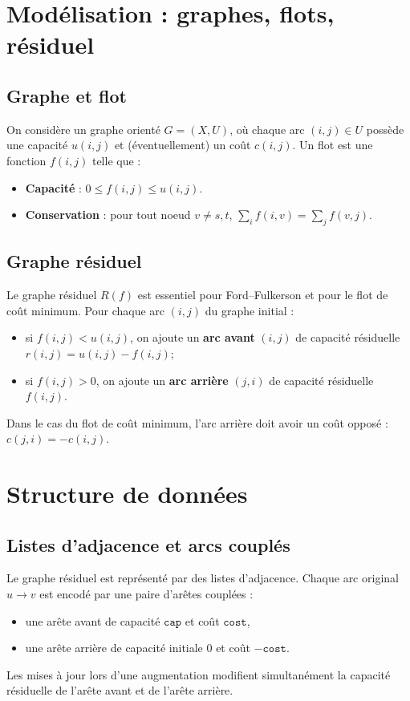 \documentclass{rapport}
\begin{document}
\section{Modélisation : graphes, flots, résiduel}\label{sec:model}
\subsection{Graphe et flot}
On considère un graphe orienté $G=(X,U)$, où chaque arc $(i,j)\in U$ possède une capacité $u(i,j)$ et (éventuellement) un coût $c(i,j)$. Un flot est une fonction $f(i,j)$ telle que :
\begin{itemize}
    \item \textbf{Capacité} : $0 \le f(i,j) \le u(i,j)$.
    \item \textbf{Conservation} : pour tout noeud $v\ne s,t$, $\sum_i f(i,v) = \sum_j f(v,j)$.
\end{itemize}

\subsection{Graphe résiduel}
Le graphe résiduel $R(f)$ est essentiel pour Ford--Fulkerson et pour le flot de coût minimum.
Pour chaque arc $(i,j)$ du graphe initial :
\begin{itemize}
    \item si $f(i,j) < u(i,j)$, on ajoute un \textbf{arc avant} $(i,j)$ de capacité résiduelle $r(i,j)=u(i,j)-f(i,j)$;
    \item si $f(i,j) > 0$, on ajoute un \textbf{arc arrière} $(j,i)$ de capacité résiduelle $f(i,j)$.
\end{itemize}
Dans le cas du flot de coût minimum, l'arc arrière doit avoir un coût opposé : $c(j,i) = -c(i,j)$.

\section{Structure de données}\label{sec:ds}
\subsection{Listes d'adjacence et arcs couplés}
Le graphe résiduel est représenté par des listes d'adjacence. Chaque arc original $u\to v$ est encodé par une paire d'arêtes couplées :
\begin{itemize}
    \item une arête \og avant \fg{} de capacité $\texttt{cap}$ et coût $\texttt{cost}$,
    \item une arête \og arrière \fg{} de capacité initiale 0 et coût $-\texttt{cost}$.
\end{itemize}
Les mises à jour lors d'une augmentation modifient simultanément la capacité résiduelle de l'arête avant et de l'arête arrière.
\end{document}
